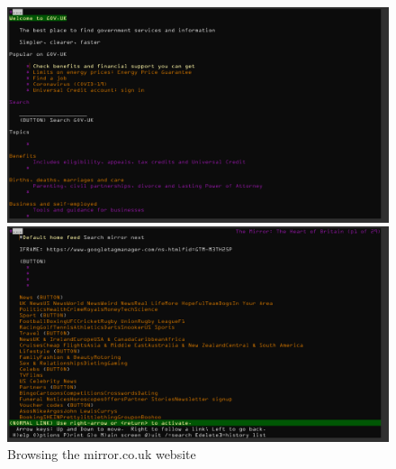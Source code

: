\begin{figure}[tp]
    \begin{minipage}{0.48\linewidth}
        \centering
        \includegraphics[keepaspectratio,width=\linewidth]
        {images/lynx-gov}
        
        \caption[Lynx browser]
        {%
        Browsing the gov.uk website
        }
        \label{fig:lynx-gov}
    \end{minipage}\hfill
    \begin{minipage}{0.48\linewidth}
        \centering
        \includegraphics[keepaspectratio,width=\linewidth]
        {images/lynx-mirror}
        
        \caption[Lynx browser]
        {%
        Browsing the mirror.co.uk website
        }
        \label{fig:lynx-mirror}
    \end{minipage}
\end{figure}

